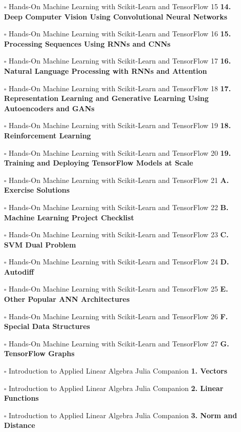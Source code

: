 \documentclass[a4, landscape, 12pt]{article}
\newcommand{\checkbox}{$\square$}%
\begin{document}
\begin{itemize}
{}
\item [\checkbox]  Hands-On Machine Learning with Scikit-Learn and TensorFlow 15 \textbf{ 14. Deep Computer Vision Using Convolutional Neural Networks
}
\item [\checkbox]  Hands-On Machine Learning with Scikit-Learn and TensorFlow 16 \textbf{ 15. Processing Sequences Using RNNs and CNNs
}
\item [\checkbox]  Hands-On Machine Learning with Scikit-Learn and TensorFlow 17 \textbf{ 16. Natural Language Processing with RNNs and Attention
}
\item [\checkbox]  Hands-On Machine Learning with Scikit-Learn and TensorFlow 18 \textbf{ 17. Representation Learning and Generative Learning Using Autoencoders and GANs
}
\item [\checkbox]  Hands-On Machine Learning with Scikit-Learn and TensorFlow 19 \textbf{ 18. Reinforcement Learning
}
\item [\checkbox]  Hands-On Machine Learning with Scikit-Learn and TensorFlow 20 \textbf{ 19. Training and Deploying TensorFlow Models at Scale
}
\item [\checkbox]  Hands-On Machine Learning with Scikit-Learn and TensorFlow 21 \textbf{ A. Exercise Solutions
}
\item [\checkbox]  Hands-On Machine Learning with Scikit-Learn and TensorFlow 22 \textbf{ B. Machine Learning Project Checklist
}
\item [\checkbox]  Hands-On Machine Learning with Scikit-Learn and TensorFlow 23 \textbf{ C. SVM Dual Problem
}
\item [\checkbox]  Hands-On Machine Learning with Scikit-Learn and TensorFlow 24 \textbf{ D. Autodiff
}
\item [\checkbox]  Hands-On Machine Learning with Scikit-Learn and TensorFlow 25 \textbf{ E. Other Popular ANN Architectures
}
\item [\checkbox]  Hands-On Machine Learning with Scikit-Learn and TensorFlow 26 \textbf{ F. Special Data Structures
}
\item [\checkbox]  Hands-On Machine Learning with Scikit-Learn and TensorFlow 27 \textbf{ G. TensorFlow Graphs
}
\item [\checkbox]  Introduction to Applied Linear Algebra Julia Companion \textbf{ 1. Vectors
}
\item [\checkbox]  Introduction to Applied Linear Algebra Julia Companion \textbf{ 2. Linear Functions
}
\item [\checkbox]  Introduction to Applied Linear Algebra Julia Companion \textbf{ 3. Norm and Distance
}
\end{itemize}
\end{document}

